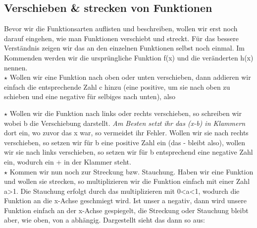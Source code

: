 \subsection{Verschieben \& strecken von Funktionen}
	Bevor wir die Funktionsarten auflisten und beschreiben, wollen wir erst noch
	darauf eingehen, wie man Funktionen verschiebt und streckt. Für das bessere
	Verständnis zeigen wir das an den einzelnen Funktionen selbst noch einmal. Im
	Kommenden werden wir die ursprüngliche Funktion f(x) und die veränderten h(x)
	nennen.\\

	\(\star\) Wollen wir eine Funktion nach oben oder unten verschieben, dann
	addieren wir einfach die entsprechende Zahl c hinzu (eine positive, um sie nach
	oben zu schieben und eine negative für selbiges nach unten), also
	\formel{\[h_1(x)=f(x)+c\]}

	\(\star\) Wollen wir die Funktion nach links oder rechts verschieben, so
	schreiben wir
	\formel{\[h_2(x)=f(x-b)\]}
	wobei b die Verschiebung darstellt. \textit{Am Besten setzt ihr das (x-b) in
	Klammern} dort ein, wo zuvor das x war, so vermeidet ihr Fehler. Wollen wir sie
	nach rechts verschieben, so setzen wir für b eine positive Zahl ein (das -
	bleibt also), wollen wir sie nach links verschieben, so setzen wir für b
	entsprechend eine negative Zahl ein, wodurch ein + in der Klammer steht.\\

	\(\star\) Kommen wir nun noch zur Streckung bzw. Stauchung. Haben wir eine
	Funktion und wollen sie strecken, so multiplizieren wir die Funktion einfach
	mit einer Zahl a>1. Die Stauchung erfolgt durch das multiplizieren mit 0<a<1,
	wodurch die Funktion an die x-Achse geschmiegt wird. Ist unser a negativ, dann
	wird unsere Funktion einfach an der x-Achse gespiegelt, die Streckung oder
	Stauchung bleibt aber, wie oben, von a abhängig. Dargestellt sieht das dann so
	aus:
	\formel{\[h_3(x)=a\cdot f(x)\]}
